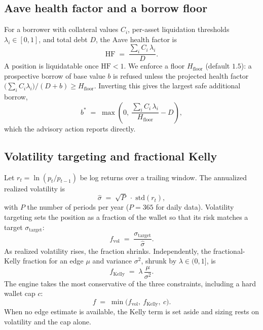 \documentclass[11pt]{article}
\begin{document}
\subsection{Aave health factor and a borrow floor}
For a borrower with collateral values $C_i$, per-asset liquidation thresholds $\lambda_i \in [0,1]$,
and total debt $D$, the Aave health factor is
\begin{equation}
\mathrm{HF} \;=\; \frac{\sum_i C_i\,\lambda_i}{D}.
\end{equation}
A position is liquidatable once $\mathrm{HF} < 1$. We enforce a floor $H_{\text{floor}}$ (default
$1.5$): a prospective borrow of base value $b$ is refused unless the projected health factor
$\big(\sum_i C_i \lambda_i\big)/(D + b) \ge H_{\text{floor}}$. Inverting this gives the largest safe
additional borrow,
\begin{equation}
b^{*} \;=\; \max\!\left(0,\ \frac{\sum_i C_i\,\lambda_i}{H_{\text{floor}}} - D\right),
\label{eq:maxborrow}
\end{equation}
which the advisory action reports directly.

\subsection{Volatility targeting and fractional Kelly}
Let $r_t = \ln(p_t / p_{t-1})$ be log returns over a trailing window. The annualized realized
volatility is
\begin{equation}
\hat{\sigma} \;=\; \sqrt{P}\;\cdot\;\mathrm{std}(r_t),
\end{equation}
with $P$ the number of periods per year ($P=365$ for daily data). Volatility targeting sets the
position as a fraction of the wallet so that its risk matches a target $\sigma_{\text{target}}$:
\begin{equation}
f_{\text{vol}} \;=\; \frac{\sigma_{\text{target}}}{\hat{\sigma}}.
\end{equation}
As realized volatility rises, the fraction shrinks. Independently, the fractional-Kelly fraction for
an edge $\mu$ and variance $\sigma^2$, shrunk by $\lambda \in (0,1]$, is
\begin{equation}
f_{\text{Kelly}} \;=\; \lambda\,\frac{\mu}{\sigma^2}.
\end{equation}
The engine takes the most conservative of the three constraints, including a hard wallet cap $c$:
\begin{equation}
f \;=\; \min\big(f_{\text{vol}},\ f_{\text{Kelly}},\ c\big).
\label{eq:min}
\end{equation}
When no edge estimate is available, the Kelly term is set aside and sizing rests on volatility and the
cap alone.
\end{document}
